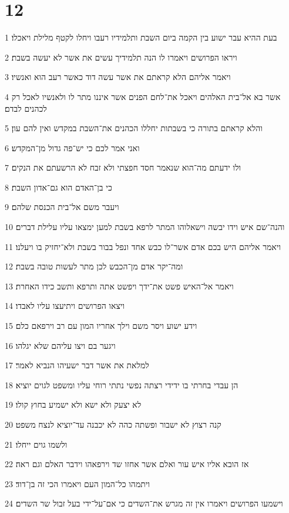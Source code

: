 \chapter{12}

\par 1 בעת ההיא עבר ישוע בין הקמה ביום השבת ותלמידיו רעבו ויחלו לקטף מלילת ויאכלו׃
\par 2 ויראו הפרושים ויאמרו לו הנה תלמידיך עשים את אשר לא יעשה בשבת׃
\par 3 ויאמר אליהם הלא קראתם את אשר עשה דוד כאשר רעב הוא ואנשיו׃
\par 4 אשר בא אל־בית האלהים ויאכל את־לחם הפנים אשר איננו מתר לו ולאנשיו לאכל רק לכהנים לבדם׃
\par 5 והלא קראתם בתורה כי בשבתות יחללו הכהנים את־השבת במקדש ואין להם עון׃
\par 6 ואני אמר לכם כי יש־פה גדול מן־המקדש׃
\par 7 ולו ידעתם מה־הוא שנאמר חסד חפצתי ולא זבח לא הרשעתם את הנקים׃
\par 8 כי בן־האדם הוא גם־אדון השבת׃
\par 9 ויעבר משם אל־בית הכנסת שלהם׃
\par 10 והנה־שם איש וידו יבשה וישאלוהו המתר לרפא בשבת למען ימצאו עליו עלילת דברים׃
\par 11 ויאמר אליהם היש בכם אדם אשר־לו כבש אחד ונפל בבור בשבת ולא־יחזיק בו ויעלנו׃
\par 12 ומה־יקר אדם מן־הכבש לכן מתר לעשות טובה בשבת׃
\par 13 ויאמר אל־האיש פשט את־ידך ויפשט אתה ותרפא ותשב כידו האחרת׃
\par 14 ויצאו הפרושים ויתיעצו עליו לאבדו׃
\par 15 וידע ישוע ויסר משם וילך אחריו המון עם רב וירפאם כלם׃
\par 16 ויגער בם ויצו עליהם שלא יגלהו׃
\par 17 למלאת את אשר דבר ישעיהו הנביא לאמר׃
\par 18 הן עבדי בחרתי בו ידידי רצתה נפשי נתתי רוחי עליו ומשפט לגוים יוציא׃
\par 19 לא יצעק ולא ישא ולא ישמיע בחוץ קולו׃
\par 20 קנה רצוץ לא ישבור ופשתה כהה לא יכבנה עד־יוציא לנצח משפט׃
\par 21 ולשמו גוים ייחלו׃
\par 22 אז הובא אליו איש עור ואלם אשר אחזו שד וירפאהו וידבר האלם וגם ראה׃
\par 23 ויתמהו כל־המון העם ויאמרו הכי זה בן־דוד׃
\par 24 וישמעו הפרושים ויאמרו אין זה מגרש את־השדים כי אם־על־ידי בעל זבול שר השדים׃
